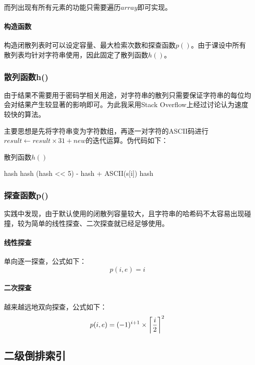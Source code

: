 \documentclass[scheme = chinese]{ctexart}
\DeclarePairedDelimiter\ceil{\lceil}{\rceil}
\begin{document}
而列出现有所有元素的功能只需要遍历$array$即可实现。

\paragraph{构造函数} 构造闭散列表时可以设定容量、最大检索次数和探查函数$p()$。由于课设中所有散列表均针对字符串使用，因此固定了散列函数$h()$。

\subsubsection{散列函数h()}
由于结果不需要用于密码学相关用途，对字符串的散列只需要保证字符串的每位均会对结果产生较显著的影响即可。为此我采用Stack Overflow上经过讨论认为速度较快的算法。

主要思想是先将字符串变为字符数组，再逐一对字符的ASCII码进行$result \gets result \times 31 + new$的迭代运算。伪代码如下：
\begin{algorithm}[H]
    \caption{散列函数$h()$}
    \begin{algorithmic}[1]
            \State hash 
                \State hash \gets (hash << 5) - hash + \textsc{ASCII}(s[i])
            \EndFor
            \State \Return hash
        \EndFunction
    \end{algorithmic}
\end{algorithm}

\subsubsection{探查函数p()}
实践中发现，由于默认使用的闭散列容量较大，且字符串的哈希码不太容易出现碰撞，较为简单的线性探查、二次探查就已经足够使用。

\paragraph{线性探查} 单向逐一探查，公式如下：
$$
p(i, e) = i
$$

\paragraph{二次探查} 越来越远地双向探查，公式如下：
$$
p(i, e) = (-1)^{i+1} \times \ceil*{\frac{i}{2}}^2
$$

\subsection{二级倒排索引}
\end{document}
